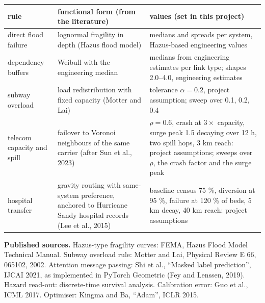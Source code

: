 \documentclass[11pt]{article}
\begin{document}
\begin{center}\small
\begin{tabular}{@{}>{\raggedright\arraybackslash}p{}>{\raggedright\arraybackslash}p{}>{\raggedright\arraybackslash}p{}@{}}
\toprule
rule & functional form (from the literature) & values (set in this project)\\
\midrule
direct flood failure & lognormal fragility in depth (Hazus flood model) & medians and spreads per system, Hazus-based engineering values\\
dependency buffers & Weibull with the engineering median & medians from engineering estimates per link type; shapes 2.0--4.0, engineering estimates\\
subway overload & load redistribution with fixed capacity (Motter and Lai) & tolerance $\alpha=0.2$, project assumption; sweep over 0.1, 0.2, 0.4\\
telecom capacity and spill & failover to Voronoi neighbours of the same carrier (after Sun et al., 2023) & $\rho=0.6$, crash at $3\times$ capacity, surge peak 1.5 decaying over 12 h, two spill hops, 3 km reach: project assumptions; sweeps over $\rho$, the crash factor and the surge peak\\
hospital transfer & gravity routing with same-system preference, anchored to Hurricane Sandy hospital records (Lee et al., 2015) & baseline census 75 \%, diversion at 95 \%, failure at 120 \% of beds, 5 km decay, 40 km reach: project assumptions\\
\bottomrule
\end{tabular}
\end{center}

\vspace{6pt}
{\small\color{grey}
\textbf{Published sources.} Hazus-type fragility curves: FEMA, Hazus Flood Model Technical Manual. Subway overload rule: Motter and Lai, Physical Review E 66, 065102, 2002. Attention message passing: Shi et al., ``Masked label prediction'', IJCAI 2021, as implemented in PyTorch Geometric (Fey and Lenssen, 2019). Hazard read-out: discrete-time survival analysis. Calibration error: Guo et al., ICML 2017. Optimiser: Kingma and Ba, ``Adam'', ICLR 2015.}
\end{document}
